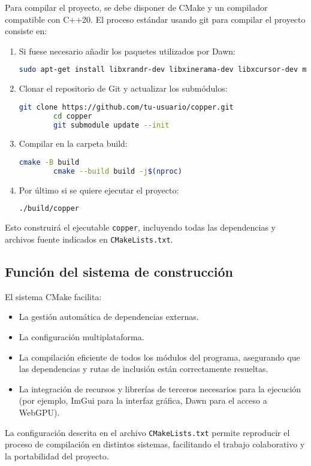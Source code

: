 Para compilar el proyecto, se debe disponer de CMake y un compilador compatible
con C++20. El proceso estándar usando git para compilar el proyecto consiste en:

\begin{enumerate}
    \item Si fuese necesario añadir los paquetes utilizados por Dawn:
          \begin{lstlisting}[language=bash]
        sudo apt-get install libxrandr-dev libxinerama-dev libxcursor-dev mesa-common-dev libx11-xcb-dev pkg-config nodejs npm\end{lstlisting}
    \item Clonar el repositorio de Git y actualizar los submódulos:
          \begin{lstlisting}[language=bash]
        git clone https://github.com/tu-usuario/copper.git
        cd copper
        git submodule update --init\end{lstlisting}
    \item Compilar en la carpeta build:
    \begin{lstlisting}[language=bash]
        cmake -B build
        cmake --build build -j$(nproc)\end{lstlisting}
    \item Por último si se quiere ejecutar el proyecto:
    \begin{lstlisting}[language=bash]
        ./build/copper\end{lstlisting}
\end{enumerate}

Esto construirá el ejecutable \texttt{copper}, incluyendo todas las
dependencias y archivos fuente indicados en \texttt{CMakeLists.txt}.

\subsection{Función del sistema de construcción}

El sistema CMake facilita:

\begin{itemize}
    \item La gestión automática de dependencias externas.
    \item La configuración multiplataforma.
    \item La compilación eficiente de todos los módulos del programa, asegurando que las
          dependencias y rutas de inclusión están correctamente resueltas.
    \item La integración de recursos y librerías de terceros necesarios para la ejecución
          (por ejemplo, ImGui para la interfaz gráfica, Dawn para el acceso a WebGPU).
\end{itemize}

La configuración descrita en el archivo \texttt{CMakeLists.txt} permite
reproducir el proceso de compilación en distintos sistemas, facilitando el
trabajo colaborativo y la portabilidad del proyecto.